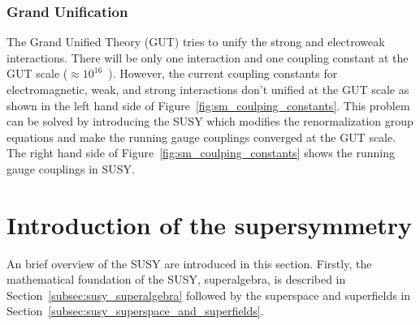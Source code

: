 
\subsubsection{Grand Unification}
\label{subsubsec:susy_gut}
The Grand Unified Theory (GUT) tries to unify the strong and electroweak interactions.
There will be only one interaction and one coupling constant at the GUT scale ($\approx 10^{16}$~{\GeV}).
However, the current coupling constants for electromagnetic, weak, and strong interactions don't unified at the GUT scale as shown in the left hand side of Figure~\ref{fig:sm_coulping_constants}.
This problem can be solved by introducing the SUSY which modifies the renormalization group equations and make the running gauge couplings converged at the GUT scale.
The right hand side of Figure~\ref{fig:sm_coulping_constants} shows the running gauge couplings in SUSY.


\section{Introduction of the supersymmetry}
\label{sec:susy_intro}
An brief overview of the SUSY are introduced in this section.
Firstly, the mathematical foundation of the SUSY, superalgebra, is described in Section~\ref{subsec:susy_superalgebra} followed by the superspace and superfields in Section~\ref{subsec:susy_superspace_and_superfields}.


